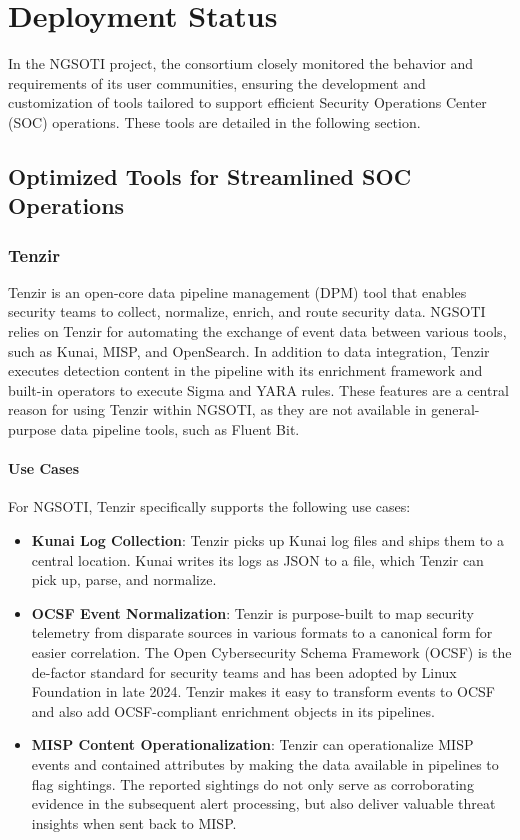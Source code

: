 \chapter{Deployment Status}\label{chdeploy}

In the NGSOTI project, the consortium closely monitored the behavior and requirements of its user communities, ensuring the development and customization of tools tailored to support efficient Security Operations Center (SOC) operations. These tools are detailed in the following section.

\section{Optimized Tools for Streamlined SOC Operations}

\subsection{Tenzir}

Tenzir is an open-core data pipeline management (DPM) tool that enables security
teams to collect, normalize, enrich, and route security data. NGSOTI relies on
Tenzir for automating the exchange of event data between various tools, such as
Kunai, MISP, and OpenSearch. In addition to data integration, Tenzir executes
detection content in the pipeline with its enrichment framework and built-in
operators to execute Sigma and YARA rules. These features are a central reason
for using Tenzir within NGSOTI, as they are not available in general-purpose
data pipeline tools, such as Fluent Bit.

\subsubsection{Use Cases}

For NGSOTI, Tenzir specifically supports the following use cases:

\begin{itemize}
\item \textbf{Kunai Log Collection}: Tenzir picks up Kunai log files and ships
	them to a central location. Kunai writes its logs as JSON to a file,
	which Tenzir can pick up, parse, and normalize.
\item \textbf{OCSF Event Normalization}: Tenzir is purpose-built to map security
	telemetry from disparate sources in various formats to a canonical form
	for easier correlation. The Open Cybersecurity Schema Framework (OCSF)
	is the de-factor standard for security teams and has been adopted by
	Linux Foundation in late 2024. Tenzir makes it easy to transform events
	to OCSF and also add OCSF-compliant enrichment objects in its pipelines.
\item \textbf{MISP Content Operationalization}: Tenzir can operationalize MISP
	events and contained attributes by making the data available in
	pipelines to flag sightings. The reported sightings do not only serve as
	corroborating evidence in the subsequent alert processing, but also
	deliver valuable threat insights when sent back to MISP.
\end{itemize}

